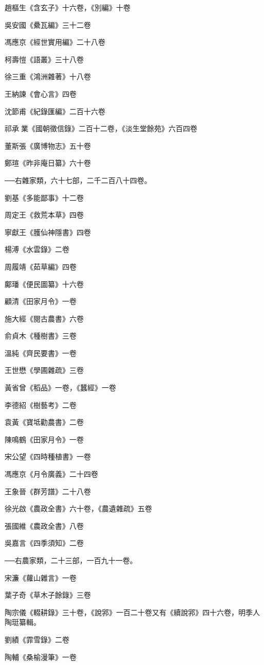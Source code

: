 趙樞生《含玄子》十六卷，《別編》十卷

吳安國《纍瓦編》三十二卷

馮應京《經世實用編》二十八卷

柯壽愷《語叢》三十八卷

徐三重《鴻洲雜著》十八卷

王納諫《會心言》四卷

沈節甫《紀錄匯編》二百十六卷

祁承業《國朝徵信錄》二百十二卷，《淡生堂餘苑》六百四卷

董斯張《廣博物志》五十卷

鄭瑄《昨非庵日纂》六十卷

──右雜家類，六十七部，二千二百八十四卷。

劉基《多能鄙事》十二卷

周定王《救荒本草》四卷

寧獻王《臒仙神隱書》四卷

楊溥《水雲錄》二卷

周履靖《茹草編》四卷

鄺璠《便民圖纂》十六卷

顧清《田家月令》一卷

施大經《閱古農書》六卷

俞貞木《種樹書》三卷

溫純《齊民要書》一卷

王世懋《學圃雜疏》三卷

黃省曾《稻品》一卷，《蠶經》一卷

李德紹《樹藝考》二卷

袁黃《寶坻勸農書》二卷

陳鳴鶴《田家月令》一卷

宋公望《四時種植書》一卷

馮應京《月令廣義》二十四卷

王象晉《群芳譜》二十八卷

徐光啟《農政全書》六十卷，《農遺雜疏》五卷

張國維《農政全書》八卷

吳嘉言《四季須知》二卷

──右農家類，二十三部，一百九十一卷。

宋濂《蘿山雜言》一卷

葉子奇《草木子餘錄》三卷

陶宗儀《輟耕錄》三十卷，《說郛》一百二十卷又有《續說郛》四十六卷，明季人陶珽纂輯。

劉績《霏雪錄》二卷

陶輔《桑榆漫筆》一卷

